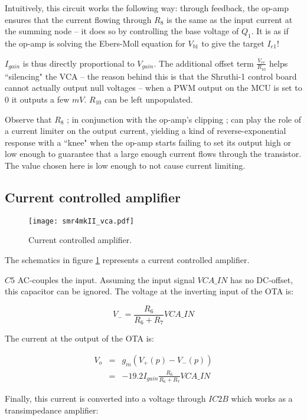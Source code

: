 \documentclass[a4paper,11pt]{article}
\begin{document}
Intuitively, this circuit works the following way: through feedback, the op-amp ensures that the current flowing through $R_8$ is the same as the input current at the summing node -- it does so by controlling the base voltage of $Q_1$. It is as if the op-amp is solving the Ebers-Moll equation for $V_{b1}$ to give the target $I_{e1}$!

$I_{gain}$ is thus directly proportional to $V_{gain}$. The additional offset term $\frac{V_{ee}}{R_{10}}$ helps ``silencing" the VCA -- the reason behind this is that the Shruthi-1 control board cannot actually output null voltages -- when a PWM output on the MCU is set to 0 it outputs a few $mV$. $R_{10}$ can be left unpopulated.

Observe that $R_8$ ; in conjunction with the op-amp's clipping ; can play the role of a current limiter on the output current, yielding a kind of reverse-exponential response with a ``knee" when the op-amp starts failing to set its output high or low enough to guarantee that a large enough current flows through the transistor. The value chosen here is low enough to not cause current limiting.

\subsection{Current controlled amplifier}

\begin{figure}
\centering
\texttt{[image: smr4mkII\_vca.pdf]}
\caption{Current controlled amplifier.}
\label{fig:vca}
\end{figure}

The schematics in figure \ref{fig:vca} represents a current controlled amplifier.

$C5$ AC-couples the input. Assuming the input signal $VCA\_IN$ has no DC-offset, this capacitor can be ignored. The voltage at the inverting input of the OTA is:

\begin{equation}
V_- = \frac{R_6}{R_6 + R_7} VCA\_IN
\end{equation}

The current at the output of the OTA is:

\begin{eqnarray}
V_o &=& g_m (V_+(p) - V_-(p)) \\
 &=& -19.2 I_{gain} \frac{R_6}{R_6 + R_7} VCA\_IN
\end{eqnarray}

Finally, this current is converted into a voltage through $IC2B$ which works as a transimpedance amplifier:
\end{document}
